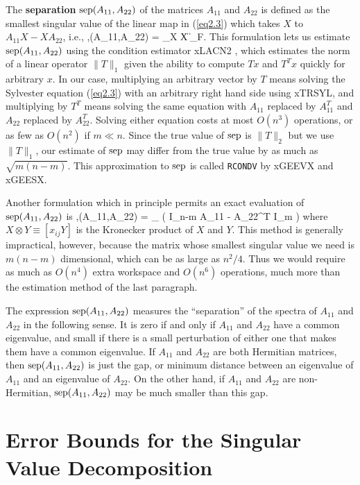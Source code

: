 The {\bf separation} ${\rm sep} (A_{11},A_{22})$ of the matrices $A_{11}$ and
$A_{22}$ is defined as the smallest singular value of the linear
map in (\ref{eq2.3}) which takes $X$ to $A_{11}X - XA_{22}$, i.e.,
\bq\label{eq2.4}
\sep (A_{11},A_{22}) = \min_{X } 
{\| X \|_F}.
\eq
This formulation lets us estimate ${\rm sep} (A_{11},A_{22})$
using the condition estimator
xLACN2 \cite{hager84,higham1,nick2}, which estimates the norm of
a linear operator $\| T \|_1$ given the ability to compute $Tx$ and
$T^Tx$ quickly for arbitrary $x$.
In our case, multiplying an
arbitrary vector by $T$
means solving the Sylvester equation (\ref{eq2.3})
with an arbitrary right hand side using xTRSYL, and multiplying by
$T^T$ means solving the same equation with $A_{11}$ replaced by
$A_{11}^T$ and $A_{22}$ replaced by $A_{22}^T$. Solving either equation
costs at most $O(n^3)$ operations, or as few as $O(n^2)$ if $m \ll n$.
Since the true value of ${\rm sep}$ is $\|T\|_2$ but we use $\|T\|_1$,
our estimate of ${\rm sep}$ may differ from the true value by as much as
$\sqrt{m(n-m)}$. This approximation to ${\rm sep}$ is called
{\tt RCONDV} by xGEEVX and xGEESX.

Another formulation which in principle permits an exact evaluation of
${\rm sep} ( A_{11},A_{22})$ is
\bq\label{eq2.5}
\sep (A_{11},A_{22}) = \sigma_{\min} ( I_{n-m} \otimes A_{11} -
A_{22}^T \otimes I_m )
\eq
where $X \otimes Y \equiv [ x_{ij} Y]$ is the Kronecker product of $X$ and $Y$.
This method is
generally impractical, however, because the matrix whose smallest singular
value we need is $m(n-m)$ dimensional, which can be as large as
$n^2/4$. Thus we would require as much as $O( n^4 )$ extra workspace and
$O(n^6)$ operations, much more than the estimation method of the last
paragraph.

The expression ${\rm sep} ( A_{11},A_{22})$ measures the ``separation'' of
the spectra
of $A_{11}$ and $A_{22}$ in the following sense. It is zero if and only if
$A_{11}$ and $A_{22}$ have a common eigenvalue, and small if there is a small
perturbation of either one that makes them have a common eigenvalue. If
$A_{11}$ and $A_{22}$ are both Hermitian matrices, then ${\rm sep} ( A_{11},A_{22})$
is just the gap, or minimum distance between an eigenvalue of $A_{11}$ and an
eigenvalue of $A_{22}$. On the other hand, if $A_{11}$ and $A_{22}$ are
non-Hermitian, ${\rm sep} ( A_{11},A_{22})$ may be much smaller than
this gap.

\section{Error Bounds for the Singular Value Decomposition}\label{secsvd}

